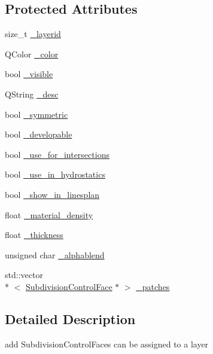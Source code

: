 \subsection*{Protected Attributes}
\begin{DoxyCompactItemize}
\item 
size\-\_\-t \hyperlink{classShipCAD_1_1SubdivisionLayer_a73e4956d179d6ebd6c062e7e76bca196}{\-\_\-layerid}
\item 
Q\-Color \hyperlink{classShipCAD_1_1SubdivisionLayer_a6da22248952737662360fa3b2730a35f}{\-\_\-color}
\item 
bool \hyperlink{classShipCAD_1_1SubdivisionLayer_a2d606476aba40bbbfc115c449f46ac26}{\-\_\-visible}
\item 
Q\-String \hyperlink{classShipCAD_1_1SubdivisionLayer_a33bbfedf8f0d130d91c74a65a575eb2a}{\-\_\-desc}
\item 
bool \hyperlink{classShipCAD_1_1SubdivisionLayer_aaeddcdf1d08d84c76c5453f4a71fbe7a}{\-\_\-symmetric}
\item 
bool \hyperlink{classShipCAD_1_1SubdivisionLayer_a81dad738f58f9b4632c1575d0b59ddb0}{\-\_\-developable}
\item 
bool \hyperlink{classShipCAD_1_1SubdivisionLayer_a8213aa3e02493472fb11949f595446f2}{\-\_\-use\-\_\-for\-\_\-intersections}
\item 
bool \hyperlink{classShipCAD_1_1SubdivisionLayer_ad36d65882f0c46ff1b3ced7d48c173f4}{\-\_\-use\-\_\-in\-\_\-hydrostatics}
\item 
bool \hyperlink{classShipCAD_1_1SubdivisionLayer_a373fd987b5f973a995517e7f97fda5ac}{\-\_\-show\-\_\-in\-\_\-linesplan}
\item 
float \hyperlink{classShipCAD_1_1SubdivisionLayer_adfdd4e996a5be7147a2eeb682dd93ff8}{\-\_\-material\-\_\-density}
\item 
float \hyperlink{classShipCAD_1_1SubdivisionLayer_a00a308fdf03a0c1d9a6fa65f965e7942}{\-\_\-thickness}
\item 
unsigned char \hyperlink{classShipCAD_1_1SubdivisionLayer_a1681170da038b0708d1b4dcd2ec89b81}{\-\_\-alphablend}
\item 
std\-::vector\\*
$<$ \hyperlink{classShipCAD_1_1SubdivisionControlFace}{Subdivision\-Control\-Face} $\ast$ $>$ \hyperlink{classShipCAD_1_1SubdivisionLayer_a98b25b86a7104e4f987d34506438113f}{\-\_\-patches}
\end{DoxyCompactItemize}


\subsection{Detailed Description}
add Subdivision\-Control\-Faces can be assigned to a layer 

